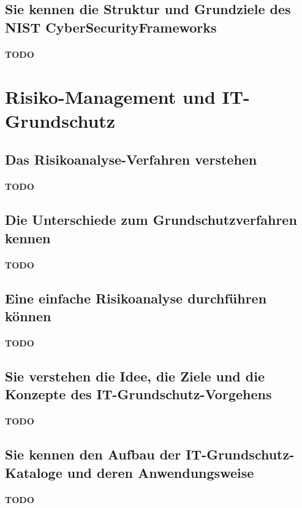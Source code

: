 \documentclass[10pt,a4paper]{article}
\begin{document}
\subsection*{Sie kennen die Struktur und Grundziele des NIST CyberSecurityFrameworks}
\paragraph*{TODO}

\section{Risiko-Management und IT-Grundschutz}
\subsection*{Das Risikoanalyse-Verfahren verstehen}
\paragraph*{TODO}
\subsection*{Die Unterschiede zum Grundschutzverfahren kennen}
\paragraph*{TODO}
\subsection*{Eine einfache Risikoanalyse durchführen können}
\paragraph*{TODO}
\subsection*{Sie verstehen die Idee, die Ziele und die Konzepte des IT-Grundschutz-Vorgehens}
\paragraph*{TODO}
\subsection*{Sie kennen den Aufbau der IT-Grundschutz-Kataloge und deren Anwendungsweise}
\paragraph*{TODO}
\end{document}
